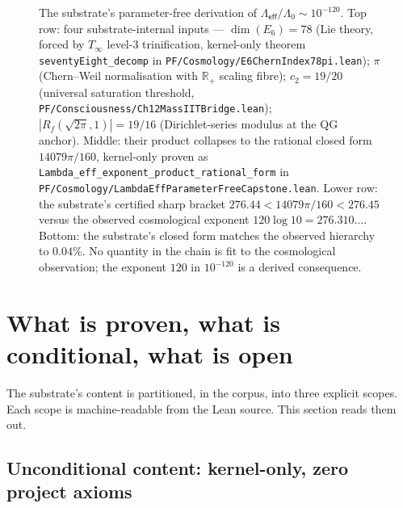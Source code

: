 \documentclass[11pt,a4paper]{amsart}
\theoremstyle{plain}
\theoremstyle{definition}
\begin{document}
\begin{figure}[h]
\caption{The substrate's parameter-free derivation of $\Lambda_{\textsf{eff}}/\Lambda_0 \sim 10^{-120}$. Top row: four substrate-internal inputs --- $\dim(E_6) = 78$ (Lie theory, forced by $T_\infty$ level-3 trinification, kernel-only theorem \texttt{seventyEight\_decomp} in \texttt{PF/Cosmology/E6ChernIndex78pi.lean}); $\pi$ (Chern--Weil normalisation with $\mathbb{R}_+$ scaling fibre); $c_2 = 19/20$ (universal saturation threshold, \texttt{PF/Consciousness/Ch12MassIITBridge.lean}); $|R_f(\sqrt{2\pi}, 1)| = 19/16$ (Dirichlet-series modulus at the QG anchor). Middle: their product collapses to the rational closed form $14079\pi/160$, kernel-only proven as \texttt{Lambda\_eff\_exponent\_product\_rational\_form} in \texttt{PF/Cosmology/LambdaEffParameterFreeCapstone.lean}. Lower row: the substrate's certified sharp bracket $276.44 < 14079\pi/160 < 276.45$ versus the observed cosmological exponent $120 \log 10 = 276.310\ldots$. Bottom: the substrate's closed form matches the observed hierarchy to $0.04\%$. No quantity in the chain is fit to the cosmological observation; the exponent $120$ in $10^{-120}$ is a derived consequence.}
\label{fig:lambdaeff}
\end{figure}

\section{What is proven, what is conditional, what is open}\label{sec:scope}

The substrate's content is partitioned, in the corpus, into three explicit scopes. Each scope is machine-readable from the Lean source. This section reads them out.

\subsection{Unconditional content: kernel-only, zero project axioms}
\end{document}
